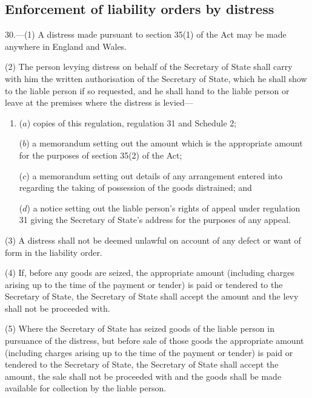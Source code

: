 \documentclass[12pt,a4paper]{article}
\begin{document}

\subsection[30. Enforcement of liability orders by distress]{Enforcement of liability orders by distress}

30.—(1) A distress made pursuant to section 35(1) of the Act may be made anywhere in England and Wales.

(2) The person levying distress on behalf of the Secretary of State shall carry with him the written authorisation of the Secretary of State, which he shall show to the liable person if so requested, and he shall hand to the liable person or leave at the premises where the distress is levied—
\begin{enumerate}\item[]
($a$) copies of this regulation, regulation 31 and Schedule 2;

($b$) a memorandum setting out the amount which is the appropriate amount for the purposes of section 35(2) of the Act;

($c$) a memorandum setting out details of any arrangement entered into regarding the taking of possession of the goods distrained; and

($d$) a notice setting out the liable person’s rights of appeal under regulation 31 giving the Secretary of State’s address for the purposes of any appeal.
\end{enumerate}

(3) A distress shall not be deemed unlawful on account of any defect or want of form in the liability order.

(4) If, before any goods are seized, the appropriate amount (including charges arising up to the time of the payment or tender) is paid or tendered to the Secretary of State, the Secretary of State shall accept the amount and the levy shall not be proceeded with.

(5) Where the Secretary of State has seized goods of the liable person in pursuance of the distress, but before sale of those goods the appropriate amount (including charges arising up to the time of the payment or tender) is paid or tendered to the Secretary of State, the Secretary of State shall accept the amount, the sale shall not be proceeded with and the goods shall be made available for collection by the liable person.
\end{document}
